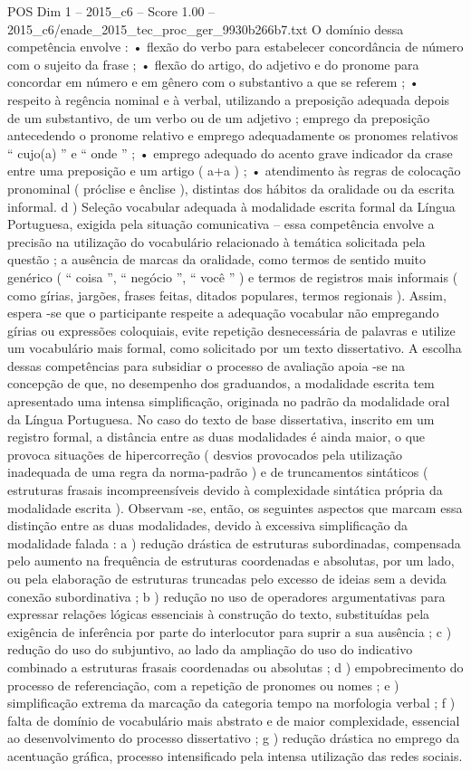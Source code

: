 \begin{textsample}{POS Dim 1 – 2015\_c6 – Score 1.00 – 2015\_c6/enade\_2015\_tec\_proc\_ger\_9930b266b7.txt}
O domínio dessa competência envolve : • flexão do verbo para estabelecer concordância de número com o sujeito da frase ; • flexão do artigo, do adjetivo e do pronome para concordar em número e em gênero com o substantivo a que se referem ; • respeito à regência nominal e à verbal, utilizando a preposição adequada depois de um substantivo, de um verbo ou de um adjetivo ; emprego da preposição antecedendo o pronome relativo e emprego adequadamente os pronomes relativos “ cujo(a) ” e “ onde ” ; • emprego adequado do acento grave indicador da crase entre uma preposição e um artigo ( a+a ) ; • atendimento às regras de colocação pronominal ( próclise e ênclise ), distintas dos hábitos da oralidade ou da escrita informal. d ) Seleção vocabular adequada à modalidade escrita formal da Língua Portuguesa, exigida pela situação comunicativa – essa competência envolve a precisão na utilização do vocabulário relacionado à temática solicitada pela questão ; a ausência de marcas da oralidade, como termos de sentido muito genérico ( “ coisa ”, “ negócio ”, “ você ” ) e termos de registros mais informais ( como gírias, jargões, frases feitas, ditados populares, termos regionais ).
Assim, espera -se que o participante respeite a adequação vocabular não empregando gírias ou expressões coloquiais, evite repetição desnecessária de palavras e utilize um vocabulário mais formal, como solicitado por um texto dissertativo.
A escolha dessas competências para subsidiar o processo de avaliação apoia -se na concepção de que, no desempenho dos graduandos, a modalidade escrita tem apresentado uma intensa simplificação, originada no padrão da modalidade oral da Língua Portuguesa.
No caso do texto de base dissertativa, inscrito em um registro formal, a distância entre as duas modalidades é ainda maior, o que provoca situações de hipercorreção ( desvios provocados pela utilização inadequada de uma regra da norma-padrão ) e de truncamentos sintáticos ( estruturas frasais incompreensíveis devido à complexidade sintática própria da modalidade escrita ).
Observam -se, então, os seguintes aspectos que marcam essa distinção entre as duas modalidades, devido à excessiva simplificação da modalidade falada : a ) redução drástica de estruturas subordinadas, compensada pelo aumento na frequência de estruturas coordenadas e absolutas, por um lado, ou pela elaboração de estruturas truncadas pelo excesso de ideias sem a devida conexão subordinativa ; b ) redução no uso de operadores argumentativas para expressar relações lógicas essenciais à construção do texto, substituídas pela exigência de inferência por parte do interlocutor para suprir a sua ausência ; c ) redução do uso do subjuntivo, ao lado da ampliação do uso do indicativo combinado a estruturas frasais coordenadas ou absolutas ; d ) empobrecimento do processo de referenciação, com a repetição de pronomes ou nomes ; e ) simplificação extrema da marcação da categoria tempo na morfologia verbal ; f ) falta de domínio de vocabulário mais abstrato e de maior complexidade, essencial ao desenvolvimento do processo dissertativo ; g ) redução drástica no emprego da acentuação gráfica, processo intensificado pela intensa utilização das redes sociais.

\end{textsample}
